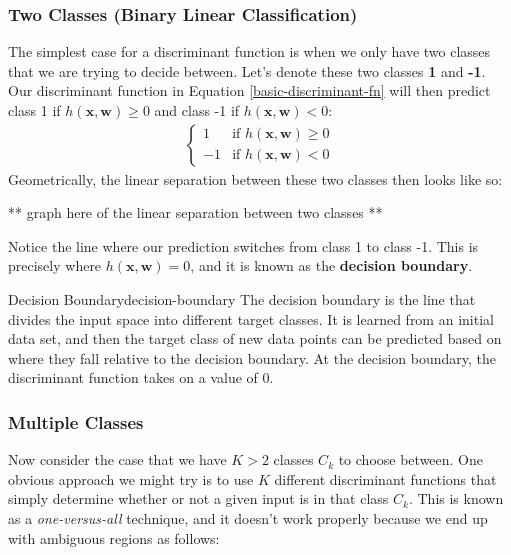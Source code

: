 \subsubsection{Two Classes (Binary Linear Classification)}
The simplest case for a discriminant function is when we only have two classes that we are trying to decide between. Let's denote these two classes \textbf{1} and \textbf{-1}. Our discriminant function in Equation \ref{basic-discriminant-fn} will then predict class 1 if $h(\textbf{x}, \textbf{w}) \geq 0$ and class -1 if $h(\textbf{x}, \textbf{w}) < 0$:
\begin{align*}
	\begin{cases} 
    	1 & \text{if } h(\textbf{x}, \textbf{w}) \geq 0 \\
    	-1 & \text{if } h(\textbf{x}, \textbf{w}) < 0
   \end{cases}
\end{align*}
Geometrically, the linear separation between these two classes then looks like so:

** graph here of the linear separation between two classes **

Notice the line where our prediction switches from class 1 to class -1. This is precisely where $h(\textbf{x}, \textbf{w}) = 0$, and it is known as the \textbf{decision boundary}.

\begin{definition}{Decision Boundary}{decision-boundary}
	The decision boundary is the line that divides the input space into different target classes. It is learned from an initial data set, and then the target class of new data points can be predicted based on where they fall relative to the decision boundary. At the decision boundary, the discriminant function takes on a value of 0.
\end{definition}


\subsubsection{Multiple Classes}
Now consider the case that we have $K > 2$ classes $C_{k}$ to choose between. One obvious approach we might try is to use $K$ different discriminant functions that simply determine whether or not a given input is in that class $C_{k}$. This is known as a \textit{one-versus-all} technique, and it doesn't work properly because we end up with ambiguous regions as follows:

